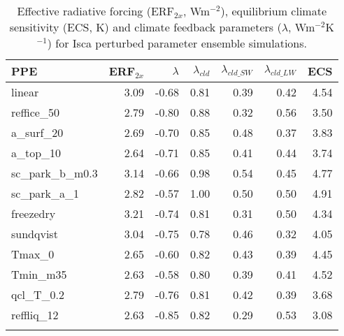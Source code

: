  \begin{table}[ht]
	\caption{Effective radiative forcing (ERF$_{2x}$, Wm$^{-2}$), equilibrium climate sensitivity (ECS, K) and climate feedback parameters ($\lambda$, Wm$^{-2}$K$^{-1}$) for Isca perturbed parameter ensemble simulations.}
	\centering
	\small
	\vspace{2em}
	\renewcommand{\arraystretch}{1.2}
    \begin{tabular}{lrrrrrr}
    \toprule
    {PPE} &  ERF$_{2x}$ &  $\lambda$ &  $\lambda_{cld}$ &  $\lambda_{cld\_SW}$ &  $\lambda_{cld\_LW}$ &  ECS \\
    \midrule
    linear         &    3.09 &   -0.68 &        0.81 &           0.39 &           0.42 & 4.54 \\
    reffice\_50     &    2.79 &   -0.80 &        0.88 &           0.32 &           0.56 & 3.50 \\
    a\_surf\_20      &    2.69 &   -0.70 &        0.85 &           0.48 &           0.37 & 3.83 \\
    a\_top\_10       &    2.64 &   -0.71 &        0.85 &           0.41 &           0.44 & 3.74 \\
    sc\_park\_b\_m0.3 &    3.14 &   -0.66 &        0.98 &           0.54 &           0.45 & 4.77 \\
    sc\_park\_a\_1    &    2.82 &   -0.57 &        1.00 &           0.50 &           0.50 & 4.91 \\
    freezedry      &    3.21 &   -0.74 &        0.81 &           0.31 &           0.50 & 4.34 \\
    sundqvist      &    3.04 &   -0.75 &        0.78 &           0.46 &           0.32 & 4.05 \\
    Tmax\_0         &    2.65 &   -0.60 &        0.82 &           0.43 &           0.39 & 4.45 \\
    Tmin\_m35       &    2.63 &   -0.58 &        0.80 &           0.39 &           0.41 & 4.52 \\
    qcl\_T\_0.2      &    2.79 &   -0.76 &        0.81 &           0.42 &           0.39 & 3.68 \\
    reffliq\_12     &    2.63 &   -0.85 &        0.82 &           0.29 &           0.53 & 3.08 \\
    \bottomrule
    \label{tab:ECS_forcing_feedback}
    \end{tabular}
\end{table}

